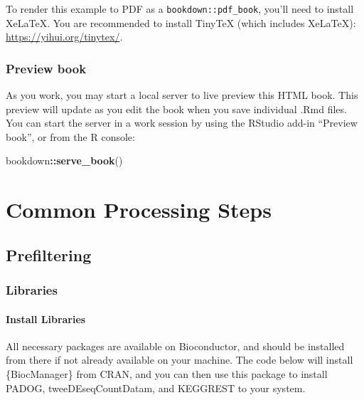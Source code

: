 \documentclass[
]{book}
\newenvironment{Shaded}{\begin{snugshade}}{\end{snugshade}}
\newcommand{\FunctionTok}[1]{\textcolor[rgb]{0.13,0.29,0.53}{\textbf{#1}}}
\newcommand{\NormalTok}[1]{#1}
\newcommand{\SpecialCharTok}[1]{\textcolor[rgb]{0.81,0.36,0.00}{\textbf{#1}}}
\begin{document}
To render this example to PDF as a \texttt{bookdown::pdf\_book}, you'll need to install XeLaTeX. You are recommended to install TinyTeX (which includes XeLaTeX): \url{https://yihui.org/tinytex/}.

\hypertarget{preview-book}{%
\section{Preview book}\label{preview-book}}

As you work, you may start a local server to live preview this HTML book. This preview will update as you edit the book when you save individual .Rmd files. You can start the server in a work session by using the RStudio add-in ``Preview book'', or from the R console:

\begin{Shaded}
\begin{Highlighting}[]
\NormalTok{bookdown}\SpecialCharTok{::}\FunctionTok{serve\_book}\NormalTok{()}
\end{Highlighting}
\end{Shaded}

\hypertarget{part-common-processing-steps}{%
\part{Common Processing Steps}\label{part-common-processing-steps}}

\hypertarget{prefiltering}{%
\chapter{Prefiltering}\label{prefiltering}}

\hypertarget{libraries}{%
\section{Libraries}\label{libraries}}

\hypertarget{install-libraries}{%
\subsection{Install Libraries}\label{install-libraries}}

All necessary packages are available on Bioconductor, and should be installed from there if not already available on your machine. The code below will install \{BiocManager\} from CRAN, and you can then use this package to install PADOG, tweeDEseqCountDatam, and KEGGREST to your system.
\end{document}
